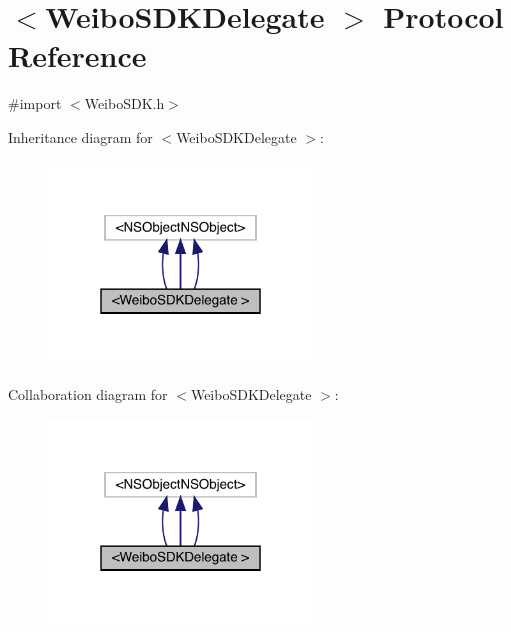\hypertarget{protocol_weibo_s_d_k_delegate_01-p}{}\section{$<$Weibo\+S\+D\+K\+Delegate $>$ Protocol Reference}
\label{protocol_weibo_s_d_k_delegate_01-p}


{\ttfamily \#import $<$Weibo\+S\+D\+K.\+h$>$}



Inheritance diagram for $<$Weibo\+S\+D\+K\+Delegate $>$\+:\nopagebreak
\begin{figure}[H]
\begin{center}
\leavevmode
\includegraphics[width=199pt]{protocol_weibo_s_d_k_delegate_01-p__inherit__graph}
\end{center}
\end{figure}


Collaboration diagram for $<$Weibo\+S\+D\+K\+Delegate $>$\+:\nopagebreak
\begin{figure}[H]
\begin{center}
\leavevmode
\includegraphics[width=199pt]{protocol_weibo_s_d_k_delegate_01-p__coll__graph}
\end{center}
\end{figure}
